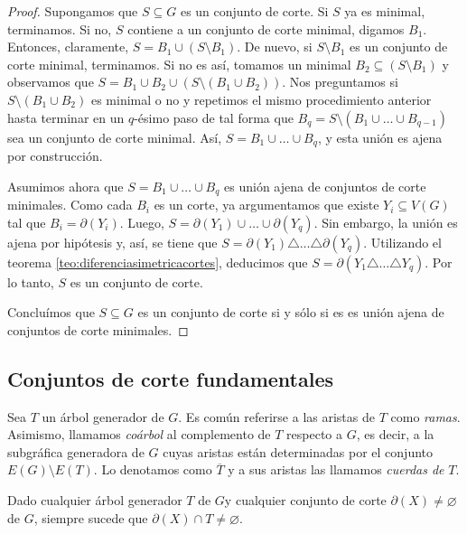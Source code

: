 \begin{proof}
Supongamos que $S \subseteq G$ es un conjunto de corte. Si $S$ ya es minimal, terminamos. Si no, $S$ contiene a un conjunto de corte minimal, digamos $B_{1}$. Entonces, claramente, $S=B_{1} \cup (S \setminus B_{1})$. De nuevo, si $S \setminus B_{1}$ es un conjunto de corte minimal, terminamos. Si no es así, tomamos un minimal $B_{2} \subseteq (S \setminus B_{1})$ y observamos que $S=B_{1} \cup B_{2} \cup (S \setminus (B_{1} \cup B_{2}))$. Nos preguntamos si $S \setminus (B_{1} \cup B_{2})$ es minimal o no y repetimos el mismo procedimiento anterior hasta terminar en un $q$-ésimo paso de tal forma que $B_{q} = S \setminus (B_{1} \cup \ldots \cup B_{q-1})$ sea un conjunto de corte minimal. Así, $S=B_{1} \cup \ldots \cup B_{q}$, y esta unión es ajena por construcción.

Asumimos ahora que $S=B_{1} \cup \ldots \cup B_{q}$ es unión ajena de conjuntos de corte minimales. Como cada $B_{i}$ es un corte, ya argumentamos que existe $Y_{i} \subseteq V(G)$ tal que $B_{i} = \partial(Y_{i})$. Luego, $S = \partial(Y_{1}) \cup \ldots \cup \partial(Y_{q})$. Sin embargo, la unión es ajena por hipótesis y, así, se tiene que $S=\partial(Y_{1}) \triangle \ldots \triangle \partial(Y_{q})$. Utilizando el teorema \ref{teo:diferenciasimetricacortes}, deducimos que $S=\partial(Y_{1} \triangle \ldots \triangle Y_{q})$. Por lo tanto, $S$ es un conjunto de corte.

Concluímos que $S \subseteq G$ es un conjunto de corte si y sólo si es es unión ajena de conjuntos de corte minimales.  

\end{proof}


\subsection{Conjuntos de corte fundamentales}
Sea $T$ un árbol generador de $G$. Es común referirse a las aristas de $T$ como \textit{ramas}. Asimismo, llamamos \textit{coárbol} al complemento de $T$ respecto a $G$, es decir, a la subgráfica generadora de $G$ cuyas aristas están determinadas por el conjunto $E(G)\setminus E(T)$. Lo denotamos como $\overline{T}$ y a sus aristas las llamamos \textit{cuerdas de} $T$.

\begin{prop}\label{prop:bondintersection}
Dado cualquier árbol generador $T$ de $G$y cualquier conjunto de corte $\partial(X) \neq \varnothing$ de $G$, siempre sucede que $\partial(X) \cap T \neq \varnothing$.

\end{prop}

